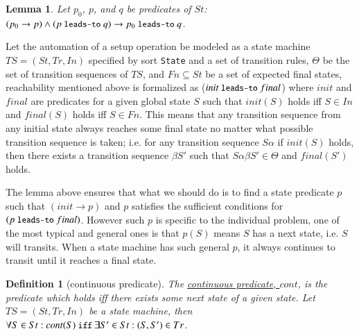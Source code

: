 \documentclass[12pt]{report}
\newtheorem{lemma}{Lemma}
\newtheorem{definition}{Definition}
\newcommand{\ra}{\rightarrow}
\newcommand{\mbstt}[1]{\mbox{\small{\tt {#1}}}}
\newcommand{\ul}{\underline}
\begin{document}
\begin{lemma}
  Let $p_0$, $p$, and $q$ be predicates of $St$:
  $(p_0 \ra p) \land (p~\mbstt{leads-to}~q) \ra
  p_0~\mbstt{leads-to}~q$.
\end{lemma}

Let the automation of a setup operation be modeled as a state machine
$TS=(St,Tr,In)$ specified by sort {\tt State} and a set of transition
rules, $\Theta$ be the set of transition sequences of $TS$, and
$Fn\subseteq St$ be a set of expected final states, reachability
mentioned above is formalized as ($init~\mbstt{leads-to}~final$) where
$init$ and $final$ are predicates for a given global state $S$ such
that $init(S)$ holds iff $S \in In$ and $final(S)$ holds iff $S \in
Fn$. This means that any transition sequence from any initial state
always reaches some final state no matter what possible transition
sequence is taken; i.e. for any transition sequence $S\alpha$ if
$init(S)$ holds, then there exists a transition sequence $\beta S'$
such that $S\alpha\beta S'\in\Theta$ and $final(S')$ holds.

The lemma above ensures that what we should do is to find a state
predicate $p$ such that $(init\ra p)$ and $p$ satisfies the sufficient
conditions for $(p~\mbstt{leads-to}~final)$. However such $p$ is
specific to the individual problem, one of the most typical and
general ones is that $p(S)$ means $S$ has a next state, i.e. $S$ will
transits.  When a state machine has such general $p$, it always
continues to transit until it reaches a final state.

\begin{definition}[continuous predicate]
  The \ul{continuous predicate, $cont$}, is the predicate which holds
  iff there exists some next state of a given state.  Let
  $TS=(St,Tr,In)$ be a state machine, then $\forall S\in St:cont(S)
  ~\mbstt{iff}~ \exists S'\in St:(S,S')\in Tr$.
\end{definition}
\end{document}
